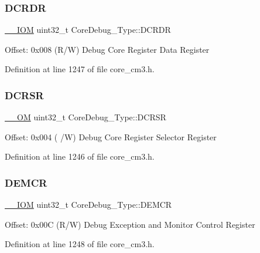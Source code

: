 \subsubsection{\texorpdfstring{D\+C\+R\+DR}{DCRDR}}
{\footnotesize\ttfamily \hyperlink{core__sc300_8h_ab6caba5853a60a17e8e04499b52bf691}{\+\_\+\+\_\+\+I\+OM} uint32\+\_\+t Core\+Debug\+\_\+\+Type\+::\+D\+C\+R\+DR}

Offset\+: 0x008 (R/W) Debug Core Register Data Register 

Definition at line 1247 of file core\+\_\+cm3.\+h.

\mbox{\label{struct_core_debug___type_af907cf64577eaf927dac6787df6dd98b}} 
\subsubsection{\texorpdfstring{D\+C\+R\+SR}{DCRSR}}
{\footnotesize\ttfamily \hyperlink{core__sc300_8h_a0ea2009ed8fd9ef35b48708280fdb758}{\+\_\+\+\_\+\+OM} uint32\+\_\+t Core\+Debug\+\_\+\+Type\+::\+D\+C\+R\+SR}

Offset\+: 0x004 ( /W) Debug Core Register Selector Register 

Definition at line 1246 of file core\+\_\+cm3.\+h.

\mbox{\label{struct_core_debug___type_aeb3126abc4c258a858f21f356c0df6ee}} 
\subsubsection{\texorpdfstring{D\+E\+M\+CR}{DEMCR}}
{\footnotesize\ttfamily \hyperlink{core__sc300_8h_ab6caba5853a60a17e8e04499b52bf691}{\+\_\+\+\_\+\+I\+OM} uint32\+\_\+t Core\+Debug\+\_\+\+Type\+::\+D\+E\+M\+CR}

Offset\+: 0x00C (R/W) Debug Exception and Monitor Control Register 

Definition at line 1248 of file core\+\_\+cm3.\+h.

\mbox{\label{struct_core_debug___type_ad63554e4650da91a8e79929cbb63db66}} 
